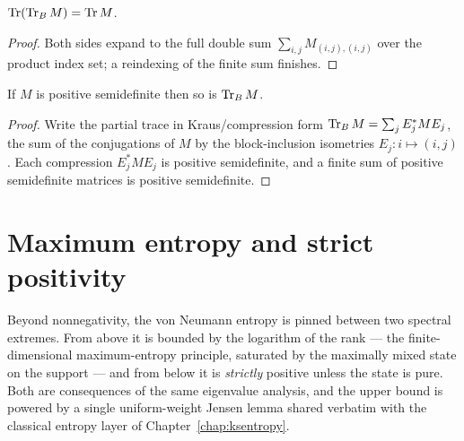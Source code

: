 \begin{lemma}\label{trace_partialTraceRight}
  \leanok
  \(\operatorname{Tr}(\operatorname{Tr}_B M) = \operatorname{Tr} M\).
\end{lemma}
\begin{proof}\leanok
  Both sides expand to the full double sum \(\sum_{i,j} M_{(i,j),(i,j)}\) over the product index
  set; a reindexing of the finite sum finishes.
\end{proof}

\begin{lemma}\label{PosSemidef.partialTraceRight}
  \leanok
  If \(M\) is positive semidefinite then so is \(\operatorname{Tr}_B M\).
\end{lemma}
\begin{proof}\leanok
  Write the partial trace in Kraus/compression form \(\operatorname{Tr}_B M = \sum_j E_j^{*} M E_j\), the sum
  of the conjugations of \(M\) by the block-inclusion isometries \(E_j : i\mapsto(i,j)\). Each
  compression \(E_j^{*} M E_j\) is positive semidefinite, and a finite sum of positive
  semidefinite matrices is positive semidefinite.
\end{proof}

\section{Maximum entropy and strict positivity}

Beyond nonnegativity, the von Neumann entropy is pinned between two spectral extremes. From above
it is bounded by the logarithm of the rank --- the finite-dimensional maximum-entropy principle,
saturated by the maximally mixed state on the support --- and from below it is \emph{strictly}
positive unless the state is pure. Both are consequences of the same eigenvalue analysis, and the
upper bound is powered by a single uniform-weight Jensen lemma shared verbatim with the classical
entropy layer of Chapter~\ref{chap:ksentropy}.


